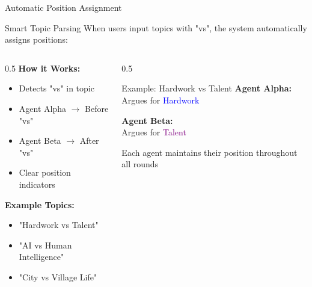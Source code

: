 \documentclass[aspectratio=169]{beamer}
\begin{document}
\begin{frame}{Automatic Position Assignment}
    \begin{block}{Smart Topic Parsing}
        When users input topics with "vs", the system automatically assigns positions:
    \end{block}
    
    \vspace{0.3cm}
    
    \begin{columns}
        \begin{column}{0.5\textwidth}
            \textbf{How it Works:}
            \begin{itemize}
                \item Detects "vs" in topic
                \item Agent Alpha $\rightarrow$ Before "vs"
                \item Agent Beta $\rightarrow$ After "vs"
                \item Clear position indicators
            \end{itemize}
            
            \vspace{0.3cm}
            
            \textbf{Example Topics:}
            \begin{itemize}
                \item "Hardwork vs Talent"
                \item "AI vs Human Intelligence"
                \item "City vs Village Life"
            \end{itemize}
        \end{column}
        
        \begin{column}{0.5\textwidth}
            \begin{exampleblock}{Example: Hardwork vs Talent}
                \small
                \textbf{Agent Alpha:}\\
                Argues for \textcolor{blue}{Hardwork}
                
                \vspace{0.3cm}
                
                \textbf{Agent Beta:}\\
                Argues for \textcolor{purple}{Talent}
                
                \vspace{0.3cm}
                
                Each agent maintains their position throughout all rounds
            \end{exampleblock}
        \end{column}
    \end{columns}
\end{frame}
\end{document}
